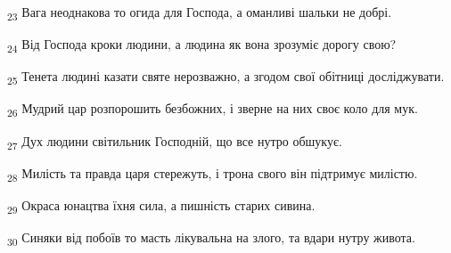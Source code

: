 \begin{tcolorbox}
\textsubscript{23} Вага неоднакова то огида для Господа, а оманливі шальки не добрі.
\end{tcolorbox}
\begin{tcolorbox}
\textsubscript{24} Від Господа кроки людини, а людина як вона зрозуміє дорогу свою?
\end{tcolorbox}
\begin{tcolorbox}
\textsubscript{25} Тенета людині казати святе нерозважно, а згодом свої обітниці досліджувати.
\end{tcolorbox}
\begin{tcolorbox}
\textsubscript{26} Мудрий цар розпорошить безбожних, і зверне на них своє коло для мук.
\end{tcolorbox}
\begin{tcolorbox}
\textsubscript{27} Дух людини світильник Господній, що все нутро обшукує.
\end{tcolorbox}
\begin{tcolorbox}
\textsubscript{28} Милість та правда царя стережуть, і трона свого він підтримує милістю.
\end{tcolorbox}
\begin{tcolorbox}
\textsubscript{29} Окраса юнацтва їхня сила, а пишність старих сивина.
\end{tcolorbox}
\begin{tcolorbox}
\textsubscript{30} Синяки від побоїв то масть лікувальна на злого, та вдари нутру живота.
\end{tcolorbox}
